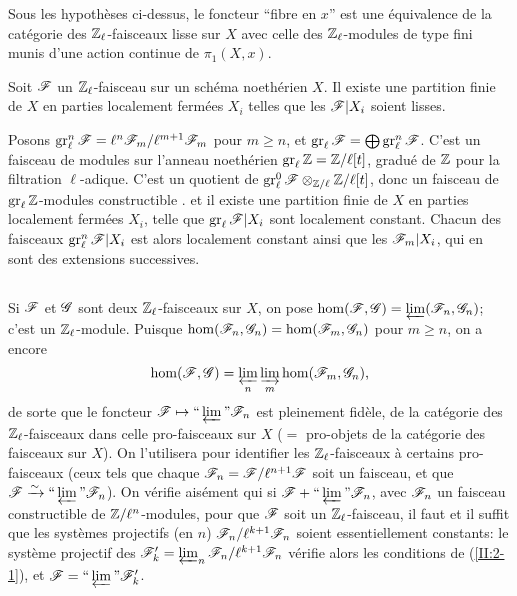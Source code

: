 \documentclass[oneside]{book}
\begin{document}
\begin{proposition_}\label{II:2-4}
Sous les hypothèses ci-dessus, le foncteur ``fibre en $x$'' est une 
équivalence de la catégorie des $\mathbb{Z}_\ell$-faisceaux lisse sur $X$ avec 
celle des $\mathbb{Z}_\ell$-modules de type fini munis d'une action continue de 
$\pi_1(X,x)$. 
\end{proposition_}





\begin{proposition_}\label{II:2-5}
Soit $\mathscr{F}$ un $\mathbb{Z}_\ell$-faisceau sur un schéma noethérien $X$. Il existe 
une partition finie de $X$ en parties localement fermées $X_i$ telles que 
les $\mathscr{F}|X_i$ soient lisses.
\end{proposition_}

Posons $\operatorname{gr}_\ell^n\mathscr{F}=\ell^n\mathscr{F}_m/\ell^{m+1}\mathscr{F}_m$ pour $m\geqslant n$, et 
$\operatorname{gr}_\ell\mathscr{F}=\bigoplus \operatorname{gr}_\ell^n\mathscr{F}$. C'est un faisceau de modules sur 
l'anneau noethérien $\operatorname{gr}_\ell\mathbb{Z}=\mathbb{Z}/\ell[t]$, gradué de $\mathbb{Z}$ pour la 
filtration $\ell$-adique. C'est un quotient de 
$\operatorname{gr}_\ell^0\mathscr{F} \otimes_{\mathbb{Z}/\ell} \mathbb{Z}/\ell[t]$, donc un faisceau de 
$\operatorname{gr}_\ell\mathbb{Z}$-modules constructible \cite[IX.2]{4}. et il existe une partition 
finie de $X$ en parties localement fermées $X_i$, telle que 
$\operatorname{gr}_\ell \mathscr{F}|X_i$ sont localement constant. Chacun des faisceaux 
$\operatorname{gr}_\ell^n\mathscr{F}|X_i$ est alors localement constant ainsi que les $\mathscr{F}_m|X_i$, 
qui en sont des extensions successives. 





\subsection{}\label{II:2-6}

Si $\mathscr{F}$ et $\mathscr{G}$ sont deux $\mathbb{Z}_\ell$-faisceaux sur $X$, on pose 
$\hom(\mathscr{F},\mathscr{G}) = \varprojlim(\mathscr{F}_n,\mathscr{G}_n)$; c'est un $\mathbb{Z}_\ell$-module. 
Puisque $\hom(\mathscr{F}_n,\mathscr{G}_n) = \hom(\mathscr{F}_m,\mathscr{G}_n)$ pour $m\geqslant n$, on a 
encore 
\[
  \hom(\mathscr{F},\mathscr{G}) = \varprojlim_n \varinjlim_m \hom(\mathscr{F}_m,\mathscr{G}_n) \text{,}
\]
de sorte que le foncteur $\mathscr{F}\mapsto \text{``}\varprojlim\text{''}\mathscr{F}_n$ est 
pleinement fidèle, de la catégorie des $\mathbb{Z}_\ell$-faisceaux dans celle 
pro-faisceaux sur $X$ ($=$ pro-objets de la catégorie des faisceaux sur $X$). 
On l'utilisera pour identifier les $\mathbb{Z}_\ell$-faisceaux à certains 
pro-faisceaux (ceux tels que chaque $\mathscr{F}_n=\mathscr{F}/\ell^{n+1}\mathscr{F}$ soit un faisceau, 
et que $\mathscr{F}\xrightarrow\sim \text{``}\varprojlim\text{''}\mathscr{F}_n$). On vérifie aisément 
qui si $\mathscr{F}+\text{``}\varprojlim\text{''}\mathscr{F}_n$, avec $\mathscr{F}_n$ un faisceau 
constructible de $\mathbb{Z}/\ell^n$-modules, pour que $\mathscr{F}$ soit un 
$\mathbb{Z}_\ell$-faisceau, il faut et il suffit que les systèmes projectifs (en $n$) 
$\mathscr{F}_n/\ell^{k+1}\mathscr{F}_n$ soient essentiellement constants: le système 
projectif des $\mathscr{F}_k'=\varprojlim_n\mathscr{F}_n/\ell^{k+1}\mathscr{F}_n$ vérifie alors les 
conditions de (\ref{II:2-1}), et $\mathscr{F}=\text{``}\varprojlim\text{''}\mathscr{F}_k'$. 
\end{document}
